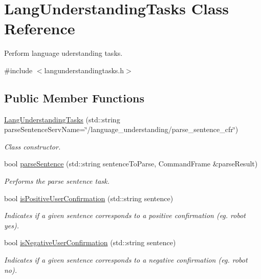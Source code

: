 \hypertarget{class_lang_understanding_tasks}{}\section{Lang\+Understanding\+Tasks Class Reference}
\label{class_lang_understanding_tasks}


Perform language uderstanding tasks.  




{\ttfamily \#include $<$langunderstandingtasks.\+h$>$}

\subsection*{Public Member Functions}
\begin{DoxyCompactItemize}
\item 
\hyperlink{class_lang_understanding_tasks_a86d3be8bceae7397f42d98d790d5f3ef}{Lang\+Understanding\+Tasks} (std\+::string parse\+Sentence\+Serv\+Name=\char`\"{}/language\+\_\+understanding/parse\+\_\+sentence\+\_\+cfr\char`\"{})
\begin{DoxyCompactList}\small\item\em Class constructor. \end{DoxyCompactList}\item 
bool \hyperlink{class_lang_understanding_tasks_af23861c3c01ff437eb2cd43be6365e90}{parse\+Sentence} (std\+::string sentence\+To\+Parse, Command\+Frame \&parse\+Result)
\begin{DoxyCompactList}\small\item\em Performs the parse sentence task. \end{DoxyCompactList}\item 
bool \hyperlink{class_lang_understanding_tasks_a03615696fc2e78b620edc48fea4b3362}{is\+Positive\+User\+Confirmation} (std\+::string sentence)
\begin{DoxyCompactList}\small\item\em Indicates if a given sentence corresponds to a positive confirmation (eg. robot yes). \end{DoxyCompactList}\item 
bool \hyperlink{class_lang_understanding_tasks_a9b99f278d0d726f25756267518713b6f}{is\+Negative\+User\+Confirmation} (std\+::string sentence)
\begin{DoxyCompactList}\small\item\em Indicates if a given sentence corresponds to a negative confirmation (eg. robot no). \end{DoxyCompactList}\item 

\end{DoxyCompactItemize}
